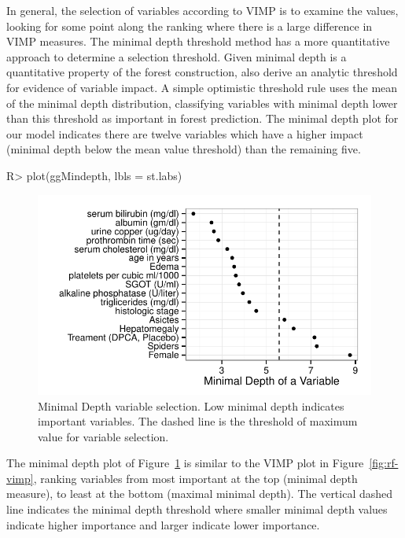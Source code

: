 \documentclass[nojss]{jss}\usepackage[]{graphicx}\usepackage[]{color}
\makeatletter
\def\maxwidth{ %
  \ifdim\Gin@nat@width>\linewidth
    \linewidth
  \else
    \Gin@nat@width
  \fi
}
\makeatother
\begin{document}
In general, the selection of variables according to VIMP is to examine the values, looking for some point along the ranking where there is a large difference in VIMP measures. The minimal depth threshold method has a more quantitative approach to determine a selection threshold. Given minimal depth is a quantitative property of the forest construction, \cite{Ishwaran:2010} also derive an analytic threshold for evidence of variable impact. A simple optimistic threshold rule uses the mean of the minimal depth distribution, classifying variables with minimal depth lower than this threshold as important in forest prediction. The minimal depth plot for our model indicates there are twelve variables which have a higher impact (minimal depth below the mean value threshold) than the remaining five. 

\begin{Schunk}
\begin{Sinput}
R> plot(ggMindepth, lbls = st.labs)
\end{Sinput}
\begin{figure}[!htpb]

{\centering \includegraphics[width=\maxwidth]{figure/rfs-mindepth-plot-1} 

}

\caption[Minimal Depth variable selection]{Minimal Depth variable selection. Low minimal depth indicates important variables. The dashed line is the threshold of maximum value for variable selection.\label{fig:mindepth-plot}}
\end{figure}
\end{Schunk}


The minimal depth plot of Figure~\ref{fig:mindepth-plot} is similar to the VIMP plot in Figure~\ref{fig:rf-vimp}, ranking variables from most important at the top (minimal depth measure), to least at the bottom (maximal minimal depth). The vertical dashed line indicates the minimal depth threshold where smaller minimal depth values indicate higher importance and larger indicate lower importance.
\end{document}
